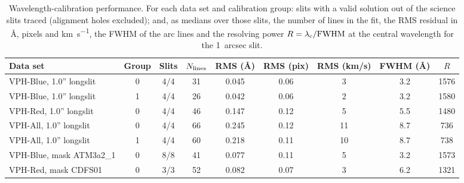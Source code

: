 \begin{table}[t]
  \centering\small
  \caption{Wavelength-calibration performance. For each data set and calibration
    group: slits with a valid solution out of the science slits traced (alignment
    holes excluded); and, as medians over
    those slits, the number of lines in the fit, the RMS residual in \AA, pixels
    and \si{\kilo\metre\per\second}, the FWHM of the arc lines and the resolving
    power $R=\lambda_{\rm c}/{\rm FWHM}$ at the central wavelength for the
    \SI{1}{arcsec} slit.}
  \label{tab:wavecal}
  \begin{tabular}{lcccccccc}
    \toprule
    Data set & Group & Slits & $N_{\rm lines}$ & RMS (\AA) & RMS (pix) & RMS (km/s) & FWHM (\AA) & $R$ \\
    \midrule
    VPH-Blue, 1.0'' longslit & 0 & 4/4 & 31 & 0.045 & 0.06 & 3 & 3.2 & 1576 \\
    VPH-Blue, 1.0'' longslit & 1 & 4/4 & 26 & 0.042 & 0.06 & 2 & 3.2 & 1580 \\
    VPH-Red, 1.0'' longslit & 0 & 4/4 & 46 & 0.147 & 0.12 & 5 & 5.5 & 1480 \\
    VPH-All, 1.0'' longslit & 0 & 4/4 & 66 & 0.245 & 0.12 & 11 & 8.7 & 736 \\
    VPH-All, 1.0'' longslit & 1 & 4/4 & 60 & 0.218 & 0.11 & 10 & 8.7 & 738 \\
    VPH-Blue, mask ATM3a2\_1 & 0 & 8/8 & 41 & 0.077 & 0.11 & 5 & 3.2 & 1573 \\
    VPH-Red, mask CDFS01 & 0 & 3/3 & 52 & 0.082 & 0.07 & 3 & 6.2 & 1321 \\
    \bottomrule
  \end{tabular}
\end{table}
